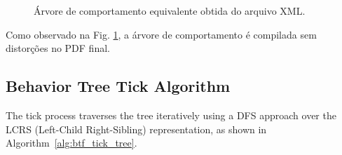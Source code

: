 \documentclass[conference]{IEEEtran}
\begin{document}
\begin{figure}[!ht]
    \centering
    \caption{Árvore de comportamento equivalente obtida do arquivo XML.}
    \label{fig:diagrama_exemplo}
\end{figure}

Como observado na Fig. \ref{fig:diagrama_exemplo}, a árvore de comportamento é compilada sem distorções no PDF final.

\subsection{Behavior Tree Tick Algorithm}
The tick process traverses the tree iteratively using a DFS approach over the LCRS (Left-Child Right-Sibling) representation, as shown in Algorithm~\ref{alg:btf_tick_tree}.
\end{document}
